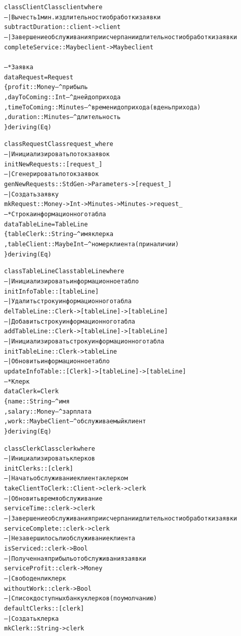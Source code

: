 \documentclass[oneside,final,12pt]{article}
\begin{document}
\begin{alltt}
class ClientClass client where
-- | Вычесть 1 мин. из длительности обработки заявки
subtractDuration :: client -> client
-- | Завершение обслуживания при исчерпании длительности обработки заявки
completeService  :: Maybe client -> Maybe client
 \\\\
-- * Заявка
data Request = Request
\{ profit       :: Money   -- ^ прибыль
	, dayToComing  :: Int     -- ^ дней до прихода
	, timeToComing :: Minutes -- ^ времени до прихода (в день прихода)
	, duration     :: Minutes -- ^ длительность
\} deriving (Eq)

class RequestClass request_ where
-- | Инициализировать поток заявок
initNewRequests :: [request_]
-- | Сгенерировать поток заявок
genNewRequests  :: StdGen -> Parameters -> [request_]
-- | Создать заявку
mkRequest       :: Money -> Int -> Minutes -> Minutes -> request_
 \\

-- * Строка информационного табла
data TableLine = TableLine
\{ tableClerk  :: String    -- ^ имя клерка
	, tableClient :: Maybe Int -- ^ номер клиента (при наличии)
\} deriving (Eq)

class TableLineClass tableLine where
-- | Инициализировать информационное табло
initInfoTable   :: [tableLine]
-- | Удалить строку информационного табла
delTableLine    :: Clerk -> [tableLine] -> [tableLine]
-- | Добавить строку информационного табла
addTableLine    :: Clerk -> [tableLine] -> [tableLine]
-- | Инициализировать строку информационного табла
initTableLine   :: Clerk -> tableLine
-- | Обновить информационное табло
updateInfoTable :: [Clerk] -> [tableLine] -> [tableLine]
 \\

-- * Клерк
data Clerk = Clerk
\{ name   :: String       -- ^ имя
	, salary :: Money        -- ^ зарплата
	, work   :: Maybe Client -- ^ обслуживаемый клиент
\} deriving (Eq)

class ClerkClass clerk where
-- | Инициализировать клерков
initClerks        :: [clerk]
-- | Начать обслуживание клиента клерком
takeClientToClerk :: Client -> clerk -> clerk
-- | Обновить время обслуживание
serviceTime       :: clerk -> clerk
-- | Завершение обслуживания при исчерпании длительности обработки заявки
serviceComplete   :: clerk -> clerk
-- | Не завершилось ли обслуживание клиента
isServiced        :: clerk -> Bool
-- | Полученная прибыль от обслуживания заявки
serviceProfit     :: clerk -> Money
-- | Свободен ли клерк
withoutWork       :: clerk -> Bool
-- | Список доступных банку клерков (по умолчанию)
defaultClerks     :: [clerk]
-- | Создать клерка
mkClerk           :: String -> clerk
 \\


\end{alltt}
\end{document}
